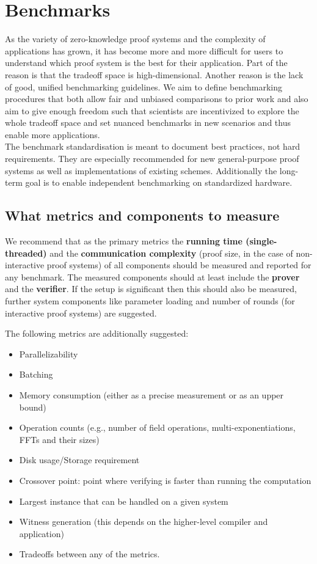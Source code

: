 \section{Benchmarks}
\label{implem:benchmarks}

As the variety of zero-knowledge proof systems and the complexity of applications has grown, it has become more and more difficult for users to understand which proof system is the best for their application. Part of the reason is that the tradeoff space is high-dimensional. Another reason is the lack of good, unified benchmarking guidelines. We aim to define benchmarking procedures that both allow fair and unbiased comparisons to prior work and also aim to give enough freedom such that scientists are incentivized to explore the whole tradeoff space and set nuanced benchmarks in new scenarios and thus enable more applications.\\
The benchmark standardisation is meant to document best practices, not hard requirements. They are especially recommended for new general-purpose proof systems as well as implementations of existing schemes. Additionally the long-term goal is to enable independent benchmarking on standardized hardware.


\subsection{What metrics and components to measure}

We recommend that as the primary metrics the \textbf{running time (single-threaded)} and the \textbf{communication complexity} (proof size, in the case of non-interactive proof systems) of all components should be measured and reported for any benchmark. The measured components should at least include the \textbf{prover} and the \textbf{verifier}. If the setup is significant then this should also be measured, further system components like parameter loading and number of rounds (for interactive proof systems) are suggested.

The following metrics are additionally suggested:
\begin{itemize}
\item Parallelizability
\item Batching
\item Memory consumption (either as a precise measurement or as an upper bound)
\item Operation counts (e.g., number of field operations, multi-exponentiations, FFTs and their sizes)
\item Disk usage/Storage requirement
\item Crossover point: point where verifying is faster than running the computation
\item Largest instance that can be handled on a given system
\item Witness generation (this depends on the higher-level compiler and application)
\item Tradeoffs between any of the metrics.
\end{itemize}



